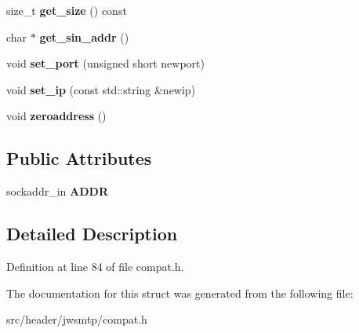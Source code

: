 \begin{DoxyCompactItemize}
\item 
\hypertarget{structjwsmtp_1_1SOCKADDR__IN_a2fa14b8fb4f89917920c8f48db1af9e5}{size\-\_\-t {\bfseries get\-\_\-size} () const }\label{structjwsmtp_1_1SOCKADDR__IN_a2fa14b8fb4f89917920c8f48db1af9e5}

\item 
\hypertarget{structjwsmtp_1_1SOCKADDR__IN_a85af8047968eec8bb4d534f30cb120ba}{char $\ast$ {\bfseries get\-\_\-sin\-\_\-addr} ()}\label{structjwsmtp_1_1SOCKADDR__IN_a85af8047968eec8bb4d534f30cb120ba}

\item 
\hypertarget{structjwsmtp_1_1SOCKADDR__IN_aa64b304782ebcec318d12b6e4137de0b}{void {\bfseries set\-\_\-port} (unsigned short newport)}\label{structjwsmtp_1_1SOCKADDR__IN_aa64b304782ebcec318d12b6e4137de0b}

\item 
\hypertarget{structjwsmtp_1_1SOCKADDR__IN_aa5a98e0ccbe4c286b944de1bcc75d9c5}{void {\bfseries set\-\_\-ip} (const std\-::string \&newip)}\label{structjwsmtp_1_1SOCKADDR__IN_aa5a98e0ccbe4c286b944de1bcc75d9c5}

\item 
\hypertarget{structjwsmtp_1_1SOCKADDR__IN_a3c825338ac7bd9b2d0dcf7514dfaaa2a}{void {\bfseries zeroaddress} ()}\label{structjwsmtp_1_1SOCKADDR__IN_a3c825338ac7bd9b2d0dcf7514dfaaa2a}

\end{DoxyCompactItemize}
\subsection*{Public Attributes}
\begin{DoxyCompactItemize}
\item 
\hypertarget{structjwsmtp_1_1SOCKADDR__IN_ad23415107871375647977a3ac0a897a4}{sockaddr\-\_\-in {\bfseries A\-D\-D\-R}}\label{structjwsmtp_1_1SOCKADDR__IN_ad23415107871375647977a3ac0a897a4}

\end{DoxyCompactItemize}


\subsection{Detailed Description}


Definition at line 84 of file compat.\-h.



The documentation for this struct was generated from the following file\-:\begin{DoxyCompactItemize}
\item 
src/header/jwsmtp/compat.\-h\end{DoxyCompactItemize}
